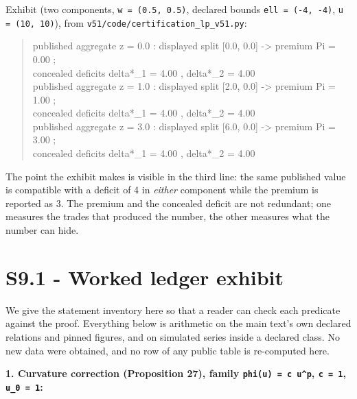 \documentclass[11pt]{article}
\begin{document}
Exhibit (two components, \texttt{w = (0.\allowbreak{}5, 0.\allowbreak{}5)}, declared bounds \texttt{ell = (-\allowbreak{}4, -\allowbreak{}4)}, \texttt{u = (10, 10)}), from \texttt{v51/code/certification\_lp\_v51.py}:

\begin{quote}\ttfamily\footnotesize\raggedright\setlength{\parskip}{0pt}
published aggregate z =  0.0 :  displayed split [0.0, 0.0] -> premium Pi =  0.00 ;\\
                                 concealed deficits delta*\_1 = 4.00 , delta*\_2 = 4.00\\
published aggregate z =  1.0 :  displayed split [2.0, 0.0] -> premium Pi =  1.00 ;\\
                                 concealed deficits delta*\_1 = 4.00 , delta*\_2 = 4.00\\
published aggregate z =  3.0 :  displayed split [6.0, 0.0] -> premium Pi =  3.00 ;\\
                                 concealed deficits delta*\_1 = 4.00 , delta*\_2 = 4.00
\end{quote}

The point the exhibit makes is visible in the third line: the same published value is compatible with a deficit of 4 in \emph{either} component while the premium is reported as 3. The premium and the concealed deficit are not redundant; one measures the trades that produced the number, the other measures what the number can hide.

\vspace{0.8em}

\section*{S9.1 - Worked ledger exhibit}\label{s91---worked-ledger-exhibit}

We give the statement inventory here so that a reader can check each predicate against the proof. Everything below is arithmetic on the main text's own declared relations and pinned figures, and on simulated series inside a declared class. No new data were obtained, and no row of any public table is re-computed here.

\textbf{1. Curvature correction (Proposition 27), family \texttt{phi(u) = c u\allowbreak{}\textasciicircum{}p}, \texttt{c = 1}, \texttt{u\_0 = 1}:}
\end{document}
